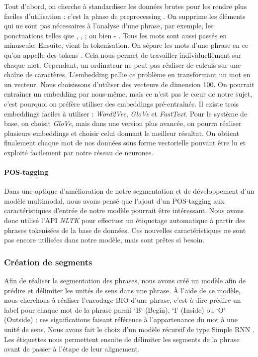 \documentclass[a4paper, twoside, 11pt]{article}
\begin{document}
Tout d’abord, on cherche à standardiser les données brutes pour les rendre plus faciles d'utilisation : c’est la phase de \og preprocessing \fg{}. On supprime les éléments qui ne sont pas nécessaires à l’analyse d’une phrase, par exemple, les ponctuations telles que \og , \fg{}, \og ; \fg{} ou bien \og - \fg{}. Tous les mots sont aussi passés en minuscule. Ensuite, vient la tokenisation. On sépare les mots d’une phrase en ce qu'on appelle des \og tokens \fg{}. Cela nous permet de travailler individuellement sur chaque mot.
Cependant, un ordinateur ne peut pas réaliser de calculs sur une chaîne de caractères. L’embedding pallie ce problème en transformant un mot en un vecteur. Nous choisissons d’utiliser des vecteurs de dimension 100. On pourrait entraîner un embedding par nous-même, mais ce n’est pas le cœur de notre sujet, c'est pourquoi on préfère utiliser des embeddings pré-entraînés. Il existe trois embeddings faciles à utiliser : \textit{Word2Vec}, \textit{GloVe} et \textit{FastText}. Pour le système de base, on choisit \textit{GloVe}, mais dans une version plus avancée, on pourra réaliser plusieurs embeddings et choisir celui donnant le meilleur résultat. On obtient finalement chaque mot de nos données sous forme vectorielle pouvant être lu et exploité facilement par notre réseau de neurones.

 \paragraph{POS-tagging}

Dans une optique d’amélioration de notre segmentation et de développement d'un modèle multimodal, nous avons pensé que l’ajout d’un \og POS-tagging \fg{} aux caractéristiques d’entrée de notre modèle pourrait être intéressant. Nous avons donc utilisé l’API \textit{NLTK} pour effectuer un étiquetage automatique à partir des phrases tokenisées de la base de données. Ces nouvelles caractéristiques ne sont pas encore utilisées dans notre modèle, mais sont prêtes si besoin.

    \subsubsection{Création de segments}
 Afin de réaliser la segmentation des phrases, nous avons créé un modèle afin de prédire et délimiter les unités de sens dans une phrase. À l’aide de ce modèle, nous cherchons à réaliser l'encodage BIO d’une phrase, c’est-à-dire prédire un label pour chaque mot de la phrase parmi ‘B’ (Begin), ‘I’ (Inside) ou ‘O’ (Outside) ; ces significations faisant référence à l’appartenance du mot à une unité de sens. Nous avons fait le choix d’un modèle récursif de type \og Simple RNN \fg{}. Les étiquettes nous permettent ensuite de délimiter les segments de la phrase avant de passer à l’étape de leur alignement.
\end{document}
